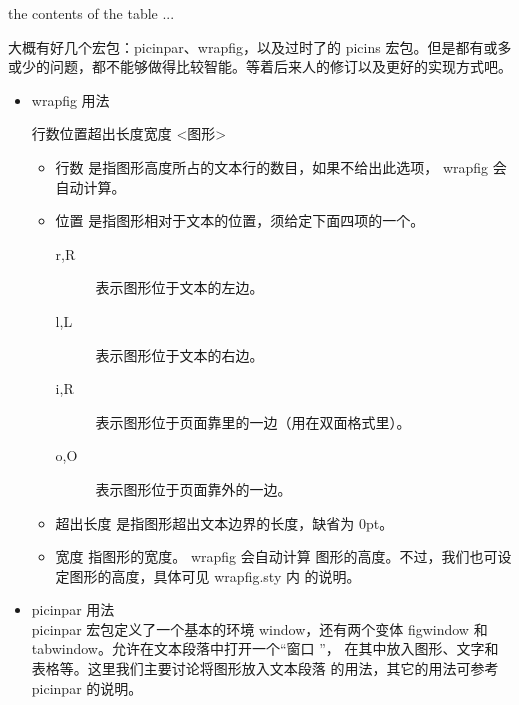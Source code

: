 \begin{texinlist}
\begin{table}[!hbt]
  the contents of the table ...
\end{table}
\end{texinlist}



大概有好几个宏包：picinpar、wrapfig，以及过时了的 picins
宏包。但是都有或多或少的问题，都不能够做得比较智能。等着后来人的修订以及更好的实现方式吧。

\begin{itemize}
  \item wrapfig 用法
  \begin{texinlist}
\begin{wrapfigure}{行数}{位置}{超出长度}{宽度}
  <图形>
\end{wrapfigure}
  \end{texinlist}
  \begin{itemize}
    \item 行数
    是指图形高度所占的文本行的数目，如果不给出此选项， wrapfig 会自动计算。
    \item 位置
    是指图形相对于文本的位置，须给定下面四项的一个。 
    \begin{description}
      \item[r,R] 表示图形位于文本的左边。
      \item[l,L] 表示图形位于文本的右边。
      \item[i,R] 表示图形位于页面靠里的一边（用在双面格式里）。
      \item[o,O] 表示图形位于页面靠外的一边。
    \end{description}
    \item 超出长度
    是指图形超出文本边界的长度，缺省为 0pt。 
    \item 宽度
    指图形的宽度。 wrapfig 会自动计算 图形的高度。不过，我们也可设定图形的高度，具体可见 wrapfig.sty 内 的说明。
  \end{itemize}
  \item picinpar 用法 \\
  picinpar 宏包定义了一个基本的环境 window，还有两个变体  figwindow 和 tabwindow。允许在文本段落中打开一个``窗口 ''， 在其中放入图形、文字和表格等。这里我们主要讨论将图形放入文本段落 的用法，其它的用法可参考 picinpar 的说明。  
  \begin{texinlist}
\begin{window} \end{window}

\end{texinlist}
\end{itemize}
